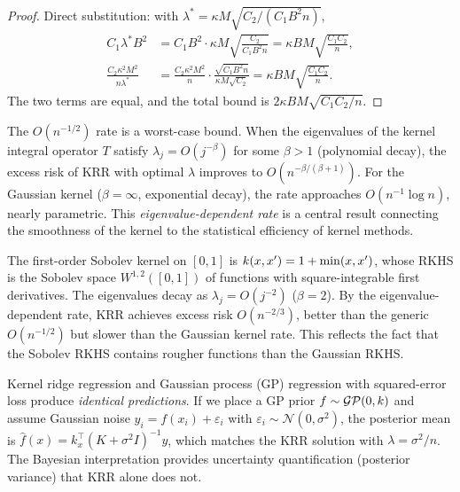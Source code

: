 \documentclass[11pt,a4paper]{article}
\begin{document}
\begin{proof}
Direct substitution: with $\lambda^* = \kappa M
\sqrt{C_2/(C_1 B^2 n)}$,
\begin{align*}
C_1 \lambda^* B^2 &= C_1 B^2 \cdot \kappa M
\sqrt{\frac{C_2}{C_1 B^2 n}}
= \kappa B M \sqrt{\frac{C_1 C_2}{n}}, \\
\frac{C_2 \kappa^2 M^2}{n \lambda^*}
&= \frac{C_2 \kappa^2 M^2}{n} \cdot
\frac{\sqrt{C_1 B^2 n}}{\kappa M \sqrt{C_2}}
= \kappa B M \sqrt{\frac{C_1 C_2}{n}}.
\end{align*}
The two terms are equal, and the total bound is
$2\kappa B M \sqrt{C_1 C_2 / n}$.
\end{proof}

\begin{keyresult}[title={KRR Rate with Eigenvalue Decay}]
\label{kr:krr-rate}
The $O(n^{-1/2})$ rate is a worst-case bound. When the eigenvalues
of the kernel integral operator $T$ satisfy $\lambda_j =
O(j^{-\beta})$ for some $\beta > 1$ (polynomial decay), the
excess risk of KRR with optimal $\lambda$ improves to
$O(n^{-\beta/(\beta+1)})$.
For the Gaussian kernel ($\beta = \infty$, exponential decay), the
rate approaches $O(n^{-1} \log n)$, nearly parametric. This
\emph{eigenvalue-dependent rate} is a central result connecting
the smoothness of the kernel to the statistical efficiency of
kernel methods.
\end{keyresult}

\begin{example}
\label{ex:krr-sobolev}
The first-order Sobolev kernel on $[0, 1]$ is $k(x, x') =
1 + \min(x, x')$, whose RKHS is the Sobolev space $W^{1,2}([0,1])$
of functions with square-integrable first derivatives. The
eigenvalues decay as $\lambda_j = O(j^{-2})$ ($\beta = 2$).
By the eigenvalue-dependent rate, KRR achieves excess risk
$O(n^{-2/3})$, better than the generic $O(n^{-1/2})$ but
slower than the Gaussian kernel rate. This reflects the fact
that the Sobolev RKHS contains rougher functions than the
Gaussian RKHS.
\end{example}

\begin{rlconnection}[title={KRR and Gaussian Process Regression}]
Kernel ridge regression and Gaussian process (GP) regression
with squared-error loss produce \emph{identical predictions}.
If we place a GP prior $f \sim \mathcal{GP}(0, k)$ and
assume Gaussian noise $y_i = f(x_i) + \varepsilon_i$ with
$\varepsilon_i \sim \mathcal{N}(0, \sigma^2)$, the posterior
mean is $\hat{f}(x) = k_x^\top (K + \sigma^2 I)^{-1} y$, which
matches the KRR solution with $\lambda = \sigma^2 / n$. The
Bayesian interpretation provides uncertainty quantification
(posterior variance) that KRR alone does not.
\end{rlconnection}
\end{document}
